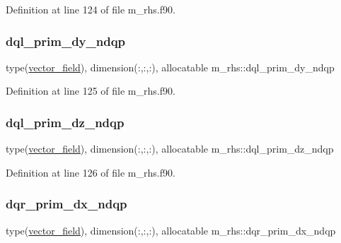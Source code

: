 Definition at line 124 of file m\+\_\+rhs.\+f90.

\mbox{\label{namespacem__rhs_abd2dcf26ba04cbfac917774656aef38b}} 
\subsubsection{\texorpdfstring{dql\+\_\+prim\+\_\+dy\+\_\+ndqp}{dql\_prim\_dy\_ndqp}}
{\footnotesize\ttfamily type(\hyperlink{structm__derived__types_1_1vector__field}{vector\+\_\+field}), dimension(\+:,\+:,\+:), allocatable m\+\_\+rhs\+::dql\+\_\+prim\+\_\+dy\+\_\+ndqp}



Definition at line 125 of file m\+\_\+rhs.\+f90.

\mbox{\label{namespacem__rhs_a4fdfac6ef18dff54b9f466f8cfb12c50}} 
\subsubsection{\texorpdfstring{dql\+\_\+prim\+\_\+dz\+\_\+ndqp}{dql\_prim\_dz\_ndqp}}
{\footnotesize\ttfamily type(\hyperlink{structm__derived__types_1_1vector__field}{vector\+\_\+field}), dimension(\+:,\+:,\+:), allocatable m\+\_\+rhs\+::dql\+\_\+prim\+\_\+dz\+\_\+ndqp}



Definition at line 126 of file m\+\_\+rhs.\+f90.

\mbox{\label{namespacem__rhs_a190b9d019243f3504246e0e621e4bc66}} 
\subsubsection{\texorpdfstring{dqr\+\_\+prim\+\_\+dx\+\_\+ndqp}{dqr\_prim\_dx\_ndqp}}
{\footnotesize\ttfamily type(\hyperlink{structm__derived__types_1_1vector__field}{vector\+\_\+field}), dimension(\+:,\+:,\+:), allocatable m\+\_\+rhs\+::dqr\+\_\+prim\+\_\+dx\+\_\+ndqp}



